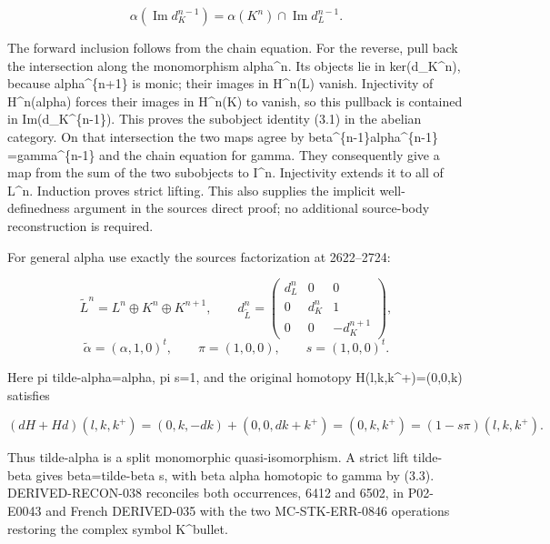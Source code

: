 \[
 \alpha(\operatorname{Im}d_K^{n-1})
       =\alpha(K^n)\cap\operatorname{Im}d_L^{n-1}.         \tag{3.1}
\]

The forward inclusion follows from the chain equation. For the reverse,\allowbreak{} pull back the intersection along the monomorphism alpha\^{}n. Its objects lie in ker(d\_\allowbreak{}K\textasciicircum{}n)\allowbreak{},\allowbreak{} because alpha\textasciicircum{}\{n\allowbreak{}+1\} is monic; their images in H\textasciicircum{}n(L)\allowbreak{} vanish. Injectivity of H\textasciicircum{}n(alpha)\allowbreak{} forces their images in H\textasciicircum{}n(K)\allowbreak{} to vanish,\allowbreak{} so this pullback is contained in Im(d\_\allowbreak{}K\textasciicircum{}\{n-1\})\allowbreak{}. This proves the subobject identity (3.1)\allowbreak{} in the abelian category. On that intersection the two maps agree by beta\^{}\{n-1\}alpha\^{}\{n-1\} \allowbreak{}=gamma\textasciicircum{}\{n-1\} and the chain equation for gamma. They consequently give a map from the sum of the two subobjects to I\^{}n. Injectivity extends it to all of L\^{}n. Induction proves strict lifting. This also supplies the implicit well-definedness argument in the source\textquotesingle s direct proof; no additional source-body reconstruction is required.

For general alpha use exactly the source\textquotesingle s factorization at 2622–\allowbreak{}2724:\allowbreak{}

\[
 \widetilde L^n=L^n\oplus K^n\oplus K^{n+1},\qquad
 d_{\widetilde L}^n=
 \begin{pmatrix}d_L^n&0&0\\0&d_K^n&1\\0&0&-d_K^{n+1}\end{pmatrix},
\] \[
 \widetilde\alpha=(\alpha,1,0)^t,\qquad
 \pi=(1,0,0),\qquad s=(1,0,0)^t.                         \tag{3.2}
\]

Here pi tilde-alpha\allowbreak{}=alpha,\allowbreak{} pi s\allowbreak{}=1,\allowbreak{} and the original homotopy H(l,\allowbreak{}k,\allowbreak{}k\textasciicircum{}\allowbreak{}+)\allowbreak{}\allowbreak{}=(0,\allowbreak{}0,\allowbreak{}k)\allowbreak{} satisfies

\[
 (dH+Hd)(l,k,k^+)=(0,k,-dk)+(0,0,dk+k^+)=(0,k,k^+)
                        =(1-s\pi)(l,k,k^+).             \tag{3.3}
\]

Thus tilde-alpha is a split monomorphic quasi-isomorphism. A strict lift tilde-beta gives beta\allowbreak{}=tilde-beta s,\allowbreak{} with beta alpha homotopic to gamma by (3.3)\allowbreak{}. DERIVED-RECON-038 reconciles both occurrences,\allowbreak{} 6412 and 6502,\allowbreak{} in P02-E0043 and French DERIVED-035 with the two MC-STK-ERR-0846 operations restoring the complex symbol K\^{}bullet.

